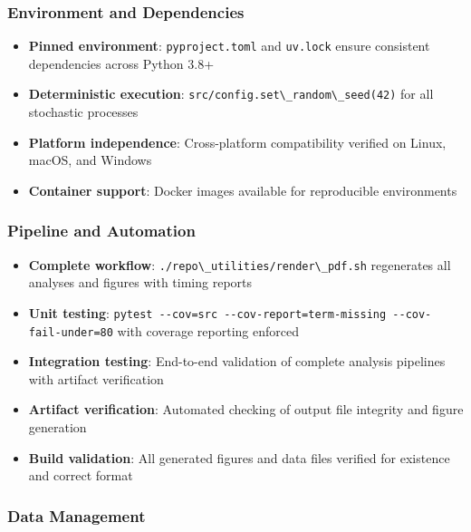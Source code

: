 \documentclass[
  13pt,
  a4paperpaper,
  12pt]{article}
\newcommand{\passthrough}[1]{#1}
\providecommand{\tightlist}{%
  \setlength{\itemsep}{0pt}\setlength{\parskip}{0pt}}
\begin{document}
\subsubsection{Environment and
Dependencies}\label{environment-and-dependencies}

\begin{itemize}
\tightlist
\item
  \textbf{Pinned environment}: \passthrough{\lstinline!pyproject.toml!}
  and \passthrough{\lstinline!uv.lock!} ensure consistent dependencies
  across Python 3.8+
\item
  \textbf{Deterministic execution}:
  \passthrough{\lstinline!src/config.set\_random\_seed(42)!} for all
  stochastic processes
\item
  \textbf{Platform independence}: Cross-platform compatibility verified
  on Linux, macOS, and Windows
\item
  \textbf{Container support}: Docker images available for reproducible
  environments
\end{itemize}

\subsubsection{Pipeline and Automation}\label{pipeline-and-automation}

\begin{itemize}
\tightlist
\item
  \textbf{Complete workflow}:
  \passthrough{\lstinline!./repo\_utilities/render\_pdf.sh!} regenerates
  all analyses and figures with timing reports
\item
  \textbf{Unit testing}:
  \passthrough{\lstinline!pytest --cov=src --cov-report=term-missing --cov-fail-under=80!}
  with coverage reporting enforced
\item
  \textbf{Integration testing}: End-to-end validation of complete
  analysis pipelines with artifact verification
\item
  \textbf{Artifact verification}: Automated checking of output file
  integrity and figure generation
\item
  \textbf{Build validation}: All generated figures and data files
  verified for existence and correct format
\end{itemize}

\subsubsection{Data Management}\label{data-management}
\end{document}

